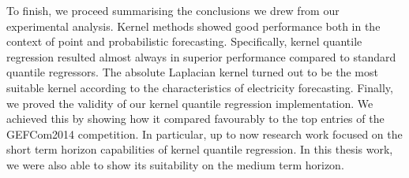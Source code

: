To finish, we proceed summarising the conclusions we drew from our experimental analysis.
Kernel methods showed good performance both in the context of point and probabilistic forecasting.
Specifically, kernel quantile regression resulted almost always in superior performance compared to standard quantile regressors. The absolute Laplacian kernel turned out to be the most suitable kernel according to the characteristics of electricity forecasting. Finally, we proved the validity of our kernel quantile regression implementation. We achieved this by showing how it compared favourably to the top entries of the GEFCom2014 competition. 
In particular, up to now research work focused on the short term horizon capabilities of kernel quantile regression. In this thesis work, we were also able to show its suitability on the medium term horizon. 